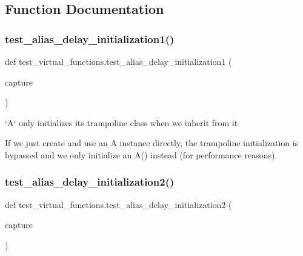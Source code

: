 \subsection{Function Documentation}
\mbox{\label{namespacetest__virtual__functions_a5c20eb78c5144f7798743969442c0d92}} 
\subsubsection{\texorpdfstring{test\_alias\_delay\_initialization1()}{test\_alias\_delay\_initialization1()}}
{\footnotesize\ttfamily def test\+\_\+virtual\+\_\+functions.\+test\+\_\+alias\+\_\+delay\+\_\+initialization1 (\begin{DoxyParamCaption}\item[{}]{capture }\end{DoxyParamCaption})}

\begin{DoxyVerb}`A` only initializes its trampoline class when we inherit from it

If we just create and use an A instance directly, the trampoline initialization is
bypassed and we only initialize an A() instead (for performance reasons).
\end{DoxyVerb}
 \mbox{\label{namespacetest__virtual__functions_a88181b0dea0f4aa4dc7c009f751fb3ff}} 
\subsubsection{\texorpdfstring{test\_alias\_delay\_initialization2()}{test\_alias\_delay\_initialization2()}}
{\footnotesize\ttfamily def test\+\_\+virtual\+\_\+functions.\+test\+\_\+alias\+\_\+delay\+\_\+initialization2 (\begin{DoxyParamCaption}\item[{}]{capture }\end{DoxyParamCaption})}

